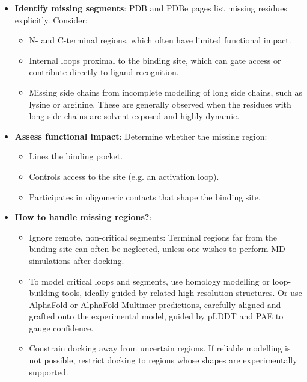 \documentclass[12pt]{article}
\begin{document}
\begin{itemize}
\item \textbf{Identify missing segments}: PDB and PDBe pages list missing residues explicitly. Consider:

\begin{itemize}
  \item N- and C-terminal regions, which often have limited functional impact.
  \item Internal loops proximal to the binding site, which can gate access or contribute directly to ligand recognition.
  \item Missing side chains from incomplete modelling of long side chains, such as lysine or arginine. These are generally observed when the residues with long side chains are solvent exposed and highly dynamic.

\end{itemize}

\item \textbf{Assess functional impact}: Determine whether the missing region:

\begin{itemize}
  \item Lines the binding pocket.
  \item Controls access to the site (e.g. an activation loop).
  \item Participates in oligomeric contacts that shape the binding site.
\end{itemize}

\item \textbf{How to handle missing regions?}:

\begin{itemize}
  \item Ignore remote, non-critical segments: Terminal regions far from the binding site can often be neglected, unless one wishes to perform MD simulations after docking.
  \item To model critical loops and segments, use homology modelling or loop-building tools, ideally guided by related high-resolution structures. Or use AlphaFold or AlphaFold-Multimer predictions\cite{CH4_Jumper2021_AlphaFold,CH4_Varadi2022_AlphaFoldDB}, carefully aligned and grafted onto the experimental model, guided by pLDDT and PAE to gauge confidence.
  \item Constrain docking away from uncertain regions. If reliable modelling is not possible, restrict docking to regions whose shapes are experimentally supported.
\end{itemize}
\end{itemize}
\end{document}
